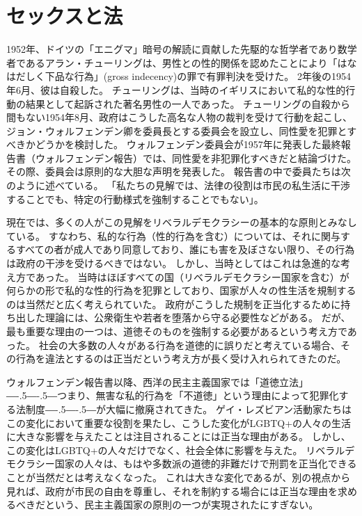 \documentclass[paper=a4,book,openany]{jlreq}
\def\DDASH{―\kern-.5\zw―\kern-.5\zw―} %
\begin{document}
\chapter{セックスと法}

1952年、ドイツの「エニグマ」暗号の解読に貢献した先駆的な哲学者であり数学者であるアラン・チューリングは、男性との性的関係を認めたことにより「はなはだしく下品な行為」(gross indecency)の罪で有罪判決を受けた。
2年後の1954年6月、彼は自殺した。
チューリングは、当時のイギリスにおいて私的な性的行動の結果として起訴された著名男性の一人であった。
チューリングの自殺から間もない1954年8月、政府はこうした高名な人物の裁判を受けて行動を起こし、ジョン・ウォルフェンデン卿を委員長とする委員会を設立し、同性愛を犯罪とすべきかどうかを検討した。
ウォルフェンデン委員会が1957年に発表した最終報告書（ウォルフェンデン報告）では、同性愛を非犯罪化すべきだと結論づけた。
その際、委員会は原則的な大胆な声明を発表した。
報告書の中で委員たちは次のように述べている。
「私たちの見解では、法律の役割は市民の私生活に干渉することでも、特定の行動様式を強制することでもない」\citep{wollfenden57:_repor_commit_homos_offen_prost}。

現在では、多くの人がこの見解をリベラルデモクラシーの基本的な原則とみなしている。
すなわち、私的な行為（性的行為を含む）については、それに関与するすべての者が成人であり同意しており、誰にも害を及ぼさない限り、その行為は政府の干渉を受けるべきではない。
しかし、当時としてはこれは急進的な考え方であった。
当時はほぼすべての国（リベラルデモクラシー国家を含む）が何らかの形で私的な性的行為を犯罪としており、国家が人々の性生活を規制するのは当然だと広く考えられていた。
政府がこうした規制を正当化するために持ち出した理論には、公衆衛生や若者を堕落から守る必要性などがある。
だが、最も重要な理由の一つは、道徳そのものを強制する必要があるという考え方であった。
社会の大多数の人々がある行為を道徳的に誤りだと考えている場合、その行為を違法とするのは正当だという考え方が長く受け入れられてきたのだ。

ウォルフェンデン報告書以降、西洋の民主主義国家では「道徳立法」{\DDASH}つまり、無害な私的行為を「不道徳」という理由によって犯罪化する法制度{\DDASH}が大幅に撤廃されてきた。
ゲイ・レズビアン活動家たちはこの変化において重要な役割を果たし、こうした変化がLGBTQ+の人々の生活に大きな影響を与えたことは注目されることには正当な理由がある。
しかし、この変化はLGBTQ+の人々だけでなく、社会全体に影響を与えた。
リベラルデモクラシー国家の人々は、もはや多数派の道徳的非難だけで刑罰を正当化できることが当然だとは考えなくなった。
これは大きな変化であるが、別の視点から見れば、政府が市民の自由を尊重し、それを制約する場合には正当な理由を求めるべきだという、民主主義国家の原則の一つが実現されたにすぎない。
\end{document}
